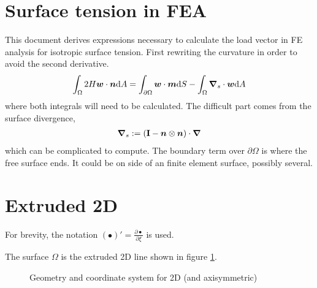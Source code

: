 \documentclass[a4paper,11pt]{article}
\renewcommand{\to}[1]{\text{\boldmath $#1$}} %
\newcommand{\ts}[1]{\text{\boldmath $\mathrm{#1}$}} %
\newcommand{\intd}[1]{\mathrm{d}#1}
\newcommand{\pderiv}[2]{\frac{\partial#1}{\partial#2}}
\newcommand{\defeq}{:=}
\begin{document}
\section{Surface tension in FEA}
This document derives expressions necessary to calculate the load vector in FE analysis for isotropic surface tension. First rewriting the curvature in order to avoid the second derivative.
\begin{align}
 \int_\Omega 2 H \to w\cdot \to n\intd A = \int_{\partial\Omega} \to w\cdot\to m\intd S - \int_\Omega \to \nabla_s \cdot \to w \intd A
 \label{eq:curvature}
\end{align}
where both integrals will need to be calculated. The difficult part comes from the surface divergence,
\begin{align}
 \to \nabla_s \defeq \left(\ts I - \to n\otimes\to n \right)\cdot \to \nabla
\end{align}
which can be complicated to compute. The boundary term over $\partial\Omega$ is where the free surface ends. It could be on side of an finite element surface, possibly several.

\section{Extruded 2D}
For brevity, the notation $(\bullet)' = \pderiv{\bullet}{\xi}$ is used.

The surface $\Omega$ is the extruded 2D line shown in figure \ref{fig:extruded}.
\begin{figure}[htpb]
 \centering
 \caption{Geometry and coordinate system for 2D (and axisymmetric)}
 \label{fig:extruded}
\end{figure}
\end{document}
